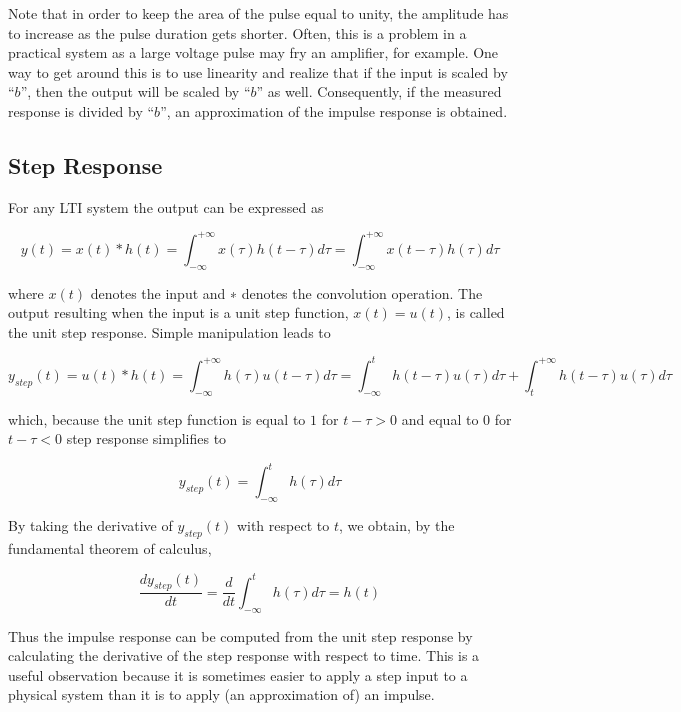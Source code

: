 \documentclass{article}
\begin{document}
Note that in order to keep the area of the pulse equal to unity, the amplitude has to increase as the pulse
duration gets shorter. Often, this is a problem in a practical system as a large voltage pulse may fry an
amplifier, for example. One way to get around this is to use linearity and realize that if the input is scaled
by ``$b$'', then the output will be scaled by ``$b$'' as well. Consequently, if the measured response is divided by
``$b$'', an approximation of the impulse response is obtained.

\subsection{Step Response}
For any LTI system the output can be expressed as

\begin{equation}
	y(t)=x(t)*h(t)=\int_{-\infty}^{+\infty}x(\tau)h(t-\tau)d\tau=\int_{-\infty}^{+\infty}x(t-\tau)h(\tau)d\tau
\end{equation}

where $x(t)$ denotes the input and ∗ denotes the convolution operation. The output resulting when the input
is a unit step function, $x(t) = u(t)$, is called the unit step response. Simple manipulation leads to

\begin{equation}
	y_{step}(t)=u(t)*h(t)=\int_{-\infty}^{+\infty}h(\tau)u(t-\tau)d\tau=\int_{-\infty}^th(t-\tau)u(\tau)d\tau+\int_t^{+\infty}h(t-\tau)u(\tau)d\tau
\end{equation}

which, because the unit step function is equal to $1$ for $t − τ > 0$ and equal to $0$ for $t − τ < 0$ step response
simplifies to

\begin{equation}
	y_{step}(t)=\int_{-\infty}^th(\tau)d\tau
\end{equation}

By taking the derivative of $y_{step}(t)$ with respect to $t$, we obtain, by the fundamental theorem of calculus,

\begin{equation}
	\frac{dy_{step}(t)}{dt}=\frac{d}{dt}\int_{-\infty}^th(\tau)d\tau=h(t)
\end{equation}

Thus the impulse response can be computed from the unit step response by calculating the derivative of the
step response with respect to time. This is a useful observation because it is sometimes easier to apply a
step input to a physical system than it is to apply (an approximation of) an impulse.
\end{document}
